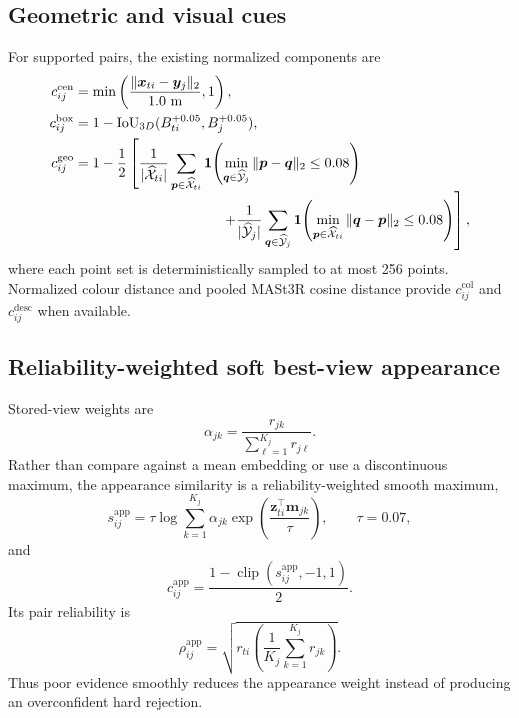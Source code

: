 \documentclass[11pt]{article}
\newcommand{\1}{\bm{1}}
\newcommand{\clip}{\operatorname{clip}}
\begin{document}
\subsection{Geometric and visual cues}

For supported pairs, the existing normalized components are
\begin{align}
c^{\mathrm{cen}}_{ij}
&=\min\left(\frac{\|\bm{x}_{ti}-\bm{y}_j\|_2}{1.0\text{ m}},1\right),\\
c^{\mathrm{box}}_{ij}
&=1-\operatorname{IoU}_{3D}(B_{ti}^{+0.05},B_j^{+0.05}),\\
c^{\mathrm{geo}}_{ij}
&=1-\frac{1}{2}\left[
\frac{1}{|\widehat{\mathcal X}_{ti}|}
\sum_{\bm p\in\widehat{\mathcal X}_{ti}}
\1\!\left(\min_{\bm q\in\widehat{\mathcal Y}_j}
\|\bm p-\bm q\|_2\leq0.08\right)
\right.\\[-0.4em]
&\hspace{37mm}\left.+
\frac{1}{|\widehat{\mathcal Y}_j|}
\sum_{\bm q\in\widehat{\mathcal Y}_j}
\1\!\left(\min_{\bm p\in\widehat{\mathcal X}_{ti}}
\|\bm q-\bm p\|_2\leq0.08\right)
\right],
\end{align}
where each point set is deterministically sampled to at most 256 points.
Normalized colour distance and pooled MASt3R cosine distance provide
$c^{\mathrm{col}}_{ij}$ and $c^{\mathrm{desc}}_{ij}$ when available.

\subsection{Reliability-weighted soft best-view appearance}

Stored-view weights are
\begin{equation}
\alpha_{jk}=\frac{r_{jk}}{\sum_{\ell=1}^{K_j}r_{j\ell}}.
\end{equation}
Rather than compare against a mean embedding or use a discontinuous maximum,
the appearance similarity is a reliability-weighted smooth maximum,
\begin{equation}
s^{\mathrm{app}}_{ij}
=\tau\log\sum_{k=1}^{K_j}
\alpha_{jk}\exp\left(
\frac{\bm z_{ti}^{\top}\bm m_{jk}}{\tau}\right),
\qquad \tau=0.07,
\end{equation}
and
\begin{equation}
c^{\mathrm{app}}_{ij}=\frac{1-\clip(s^{\mathrm{app}}_{ij},-1,1)}{2}.
\label{eq:appearance-cost}
\end{equation}
Its pair reliability is
\begin{equation}
\rho^{\mathrm{app}}_{ij}=
\sqrt{r_{ti}\left(\frac{1}{K_j}\sum_{k=1}^{K_j}r_{jk}\right)}.
\end{equation}
Thus poor evidence smoothly reduces the appearance weight instead of producing
an overconfident hard rejection.
\end{document}
